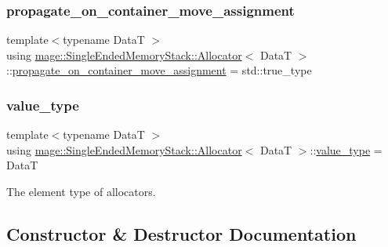 \subsubsection{\texorpdfstring{propagate\+\_\+on\+\_\+container\+\_\+move\+\_\+assignment}{propagate\_on\_container\_move\_assignment}}
{\footnotesize\ttfamily template$<$typename DataT $>$ \\
using \hyperlink{structmage_1_1_single_ended_memory_stack_1_1_allocator}{mage\+::\+Single\+Ended\+Memory\+Stack\+::\+Allocator}$<$ DataT $>$\+::\hyperlink{structmage_1_1_single_ended_memory_stack_1_1_allocator_a408c0a4b29dc60e9564245c6a0a6fd4c}{propagate\+\_\+on\+\_\+container\+\_\+move\+\_\+assignment} =  std\+::true\+\_\+type}

\hypertarget{structmage_1_1_single_ended_memory_stack_1_1_allocator_a4d5b98a534ad4e6d6f2d8eb1280398ab}{}\label{structmage_1_1_single_ended_memory_stack_1_1_allocator_a4d5b98a534ad4e6d6f2d8eb1280398ab} 
\subsubsection{\texorpdfstring{value\+\_\+type}{value\_type}}
{\footnotesize\ttfamily template$<$typename DataT $>$ \\
using \hyperlink{structmage_1_1_single_ended_memory_stack_1_1_allocator}{mage\+::\+Single\+Ended\+Memory\+Stack\+::\+Allocator}$<$ DataT $>$\+::\hyperlink{structmage_1_1_single_ended_memory_stack_1_1_allocator_a4d5b98a534ad4e6d6f2d8eb1280398ab}{value\+\_\+type} =  DataT}

The element type of allocators. 

\subsection{Constructor \& Destructor Documentation}
\hypertarget{structmage_1_1_single_ended_memory_stack_1_1_allocator_acc7f17e870881240ee354efe69f9ba34}{}\label{structmage_1_1_single_ended_memory_stack_1_1_allocator_acc7f17e870881240ee354efe69f9ba34} 
